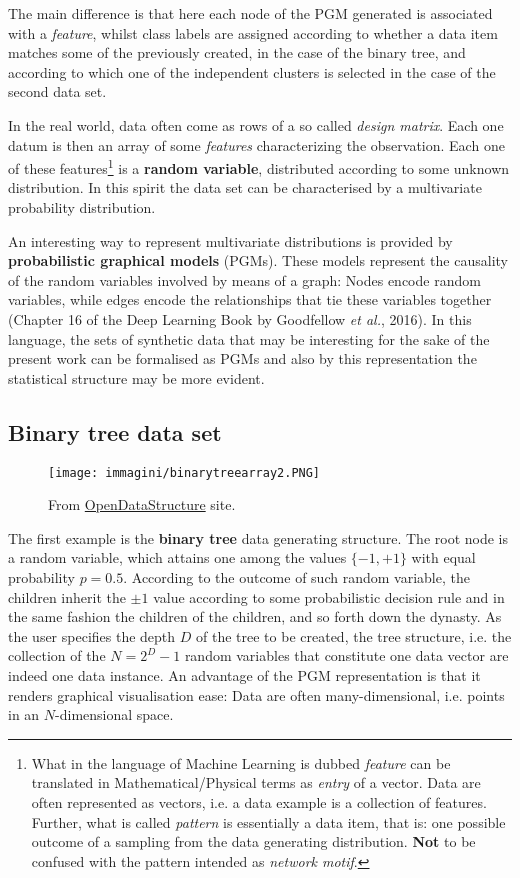 \documentclass[a4paper,12pt]{article}
\begin{document}
The main difference is that here each node of the PGM generated is associated with a \textit{feature}, whilst class labels are assigned according to whether a data item matches some of the previously created, in the case of the binary tree, and according to which one of the independent clusters is selected in the case of the second data set.

In the real world, data often come as rows of a so called \textit{design matrix}. Each one datum is then an array of some \textit{features} characterizing the observation. Each one of these features\footnote{What in the language of Machine Learning is dubbed \textit{feature} can be translated in Mathematical/Physical terms as \textit{entry} of a vector. Data are often represented as vectors, i.e. a data example is a collection of features. Further, what is called \textit{pattern} is essentially a data item, that is: one possible outcome of a sampling from the data generating distribution. \textbf{Not} to be confused with the pattern intended as \textit{network motif}.} is a \textbf{random variable}, distributed according to some unknown distribution. In this spirit the data set can be characterised by a multivariate probability distribution. 

An interesting way to represent multivariate distributions is provided by \textbf{probabilistic graphical models} (PGMs). These models represent the causality of the random variables involved by means of a graph: Nodes encode random variables, while edges encode the relationships that tie these variables together (Chapter 16 of the Deep Learning Book by Goodfellow \textit{et al.}, 2016). In this language, the sets of synthetic data that may be interesting for the sake of the present work can be formalised as PGMs and also by this representation the statistical structure may be more evident. 



\subsection{Binary tree data set}

\begin{figure}[t!]
	\centering
	\texttt{[image: immagini/binarytreearray2.PNG]}
	\caption{From \href{https://opendatastructures.org/versions/edition-0.1d/ods-java/node52.html}{OpenDataStructure} site.}
	\label{fig:tree}
\end{figure}


The first example is the \textbf{binary tree} data generating structure. The root node is a random variable, which attains one among the values $\{ -1,+1\}$ with equal probability $p = 0.5$. According to the outcome of such random variable, the children inherit the $\pm 1$ value according to some probabilistic decision rule and in the same fashion the children of the children, and so forth down the dynasty. As the user specifies the depth $D$ of the tree to be created, the tree structure, i.e. the collection of the $N = 2^{D} - 1$ random variables that constitute one data vector are indeed one data instance. An advantage of the PGM representation is that it renders graphical visualisation ease: Data are often many-dimensional, i.e. points in an $N$-dimensional space.
\end{document}
